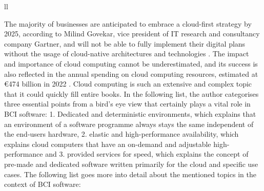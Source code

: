 \begin{table}[!ht]
{\begin{tabular}{ll}
       \\ \hline
    \end{tabular}%
  }
  \vspace{10pt}
  \caption{The three abstraction levels and types of cloud computing \citep{amazon_web_services_inc_what_nodate}.}
  \vspace{-5pt}
  \label{tab:cloud-computing-types}
\end{table}

The majority of businesses are anticipated to embrace a cloud-first strategy by 2025, according to Milind Govekar, vice president of IT research and consultancy company Gartner, and will not be able to fully implement their digital plans without the usage of cloud-native architectures and technologies \citep{gartner_gartner_nodate}. The impact and importance of cloud computing cannot be underestimated, and its success is also reflected in the annual spending on cloud computing resources, estimated at €474 billion in 2022 \citep{gartner_gartner_nodate}. Cloud computing is such an extensive and complex topic that it could quickly fill entire books. In the following list, the author categorises three essential points from a bird's eye view that certainly plays a vital role in BCI software: 1. Dedicated and deterministic environments, which explains that an environment of a software programme always stays the same independent of the end-users hardware, 2. elastic and high-performance availability, which explains cloud computers that have an on-demand and adjustable high-performance and 3. provided services for speed, which explains the concept of pre-made and dedicated software written primarily for the cloud and specific use cases. The following list goes more into detail about the mentioned topics in the context of BCI software:

